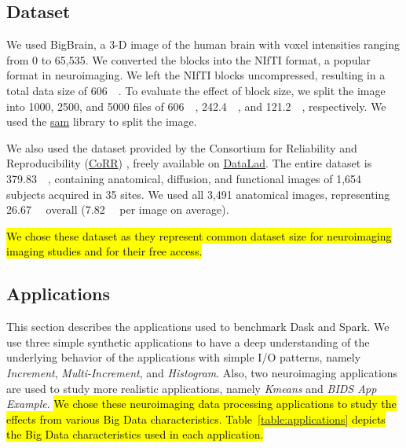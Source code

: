 \documentclass[AMA,STIX1COL]{WileyNJD-v2}
\newcommand{\HL}[1]{\hl{#1}}
\begin{document}
\subsection{Dataset}
We used BigBrain\cite{Amunts:13}, a 3-D image of the human brain with voxel
intensities ranging from 0 to 65,535. We converted the blocks into the
NIfTI format, a popular format in neuroimaging. We left the NIfTI blocks
uncompressed, resulting in a total data size of \SI{606}{\gibi\byte}. To
evaluate the effect of block size, we split the image into 1000, 2500,
and 5000 files of \SI{606}{\mebi\byte}, \SI{242.4}{\mebi\byte}, and
\SI{121.2}{\mebi\byte}, respectively.
We used the \href{https://github.com/big-data-lab-team/sam}{sam} library to split the image.
							
We also used the dataset provided by the Consortium for Reliability and
Reproducibility
(\href{http://fcon_1000.projects.nitrc.org/indi/CoRR/html/}{CoRR})
\cite{zuo2014open}, freely available on
\href{https://datasets.datalad.org/?dir=/corr/RawDataBIDS}{DataLad}.
The entire dataset is \SI{379.83}{\gibi\byte}, containing anatomical, diffusion,
and functional images of 1,654 subjects acquired in 35 sites.
We used all 3,491 anatomical images, representing \SI{26.67}{\gibi\byte} overall
(\SI{7.82}{\mebi\byte} per image on average).

\HL{
	We chose these dataset as they represent common dataset size for neuroimaging 
	imaging studies and for their free access.
}
							
\subsection{Applications}
This section describes the applications used to benchmark Dask and Spark.
We use three simple synthetic applications to have a deep understanding of the 
underlying behavior of the applications with simple I/O patterns, namely
\textit{Increment}, \textit{Multi-Increment}, and \textit{Histogram}.
Also, two neuroimaging applications are used to study more realistic 
applications, namely \textit{Kmeans} and \textit{BIDS App Example}{\cite{gorgolewski2017bids}}.
\HL{
	We chose these neuroimaging data processing applications to study the 
	effects from various Big Data characteristics.
	Table~{\ref{table:applications}} depicts the Big Data characteristics used in
	each application.
}
\end{document}
